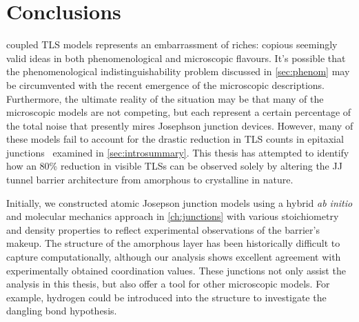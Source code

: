 \chapter{Conclusions}\label{ch:conclusions}

 coupled TLS models represents an embarrassment of riches: copious seemingly valid ideas in both phenomenological and microscopic flavours.
It's possible that the phenomenological indistinguishability problem discussed in \cref{sec:phenom} may be circumvented with the recent emergence of the microscopic descriptions.
Furthermore, the ultimate reality of the situation may be that many of the microscopic models are not competing, but each represent a certain percentage of the total noise that presently mires Josephson junction devices.
However, many of these models fail to account for the drastic reduction in TLS counts in epitaxial junctions~\cite{Oh2006} examined in \cref{sec:introsummary}.
This thesis has attempted to identify how an 80\% reduction in visible TLSs can be observed solely by altering the JJ tunnel barrier architecture from amorphous to crystalline in nature.

Initially, we constructed atomic Josepson junction models using a hybrid \textit{ab initio} and molecular mechanics approach in \cref{ch:junctions} with various stoichiometry and density properties to reflect experimental observations of the barrier's makeup.
The structure of the amorphous layer has been historically difficult to capture computationally, although our analysis shows excellent agreement with experimentally obtained coordination values.
These junctions not only assist the analysis in this thesis, but also offer a tool for other microscopic models.
For example, hydrogen could be introduced into the structure to investigate the dangling bond hypothesis.

